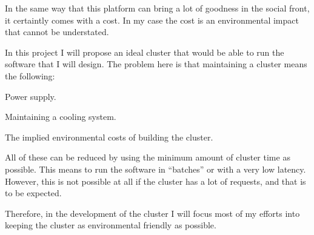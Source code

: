 In the same way that this platform can bring a lot of goodness in the social
front, it certaintly comes with a cost. In my case the cost is an environmental
impact that cannot be understated.

In this project I will propose an ideal cluster that would be able to run the
software that I will design. The problem here is that maintaining a cluster
means the following:

\mylist
  \item Power supply.
  \item Maintaining a cooling system.
  \item The implied environmental costs of building the cluster.
\mylistend

All of these can be reduced by using the minimum amount of cluster time as
possible. This means to run the software in ``batches'' or with a very low
latency. However, this is not possible at all if the cluster has a lot of
requests, and that is to be expected.

Therefore, in the development of the cluster I will focus most of my efforts
into keeping the cluster as environmental friendly as possible.
